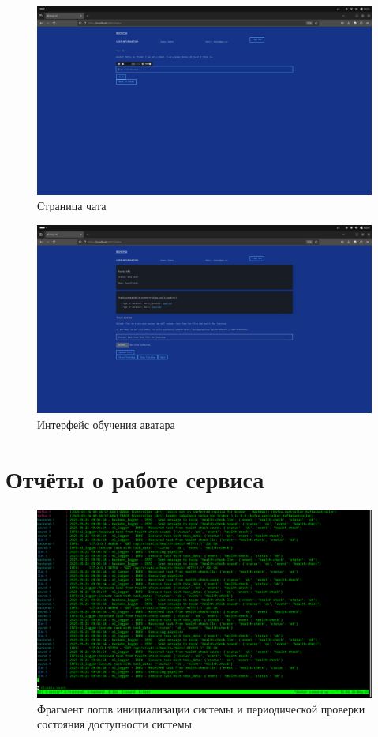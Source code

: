 \begin{figure}
    \centering
    \includegraphics[width=1.0\linewidth]{images/ui/chat2.png}
    \caption{Страница чата}
    \label{fig:ui-page-chat2}
\end{figure}

\begin{figure}
    \centering
    \includegraphics[width=1.0\linewidth]{images/ui/train.png}
    \caption{Интерфейс обучения аватара}
    \label{fig:ui-page-train}
\end{figure}

\chapter{Отчёты о работе сервиса}\label{app:B}

\begin{figure}[h!]
    \centering
    \includegraphics[width=1.0\linewidth]{images/results/health-check.png}
    \caption{Фрагмент логов инициализации системы и периодической проверки состояния доступности системы}
    \label{fig:res-healt-check}
\end{figure}

